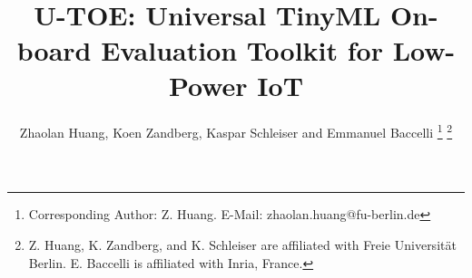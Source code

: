 \documentclass[journal]{IEEEtran}
\begin{document}
%


\title{
\footnotesize
{}
 \ \\ \ \\ \ \\
\Huge U-TOE: Universal TinyML On-board Evaluation Toolkit for Low-Power IoT}
%
%
%

\author{Zhaolan Huang, Koen Zandberg, Kaspar Schleiser and Emmanuel Baccelli%
\thanks{Corresponding Author: Z. Huang. E-Mail: zhaolan.huang@fu-berlin.de}%
\thanks{Z. Huang, K. Zandberg, and K. Schleiser are affiliated with Freie Universität Berlin. 
E. Baccelli is affiliated with Inria, France. %
}%
}
% 
%
\end{document}
